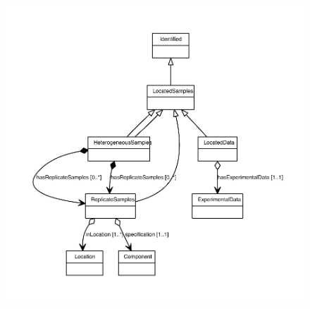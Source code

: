 \begin{figure}[ht]
\begin{center}
\includegraphics[scale=0.8]{uml/HeterogeneousSamples_abstraction_hierarchy.pdf}
\end{center}
\end{figure}


